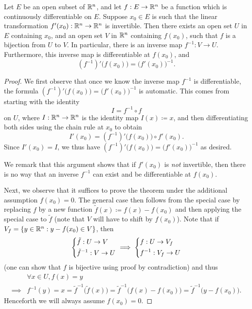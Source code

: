 \begin{thm}\label{ii:6.7.2}
  Let \(E\) be an open subset of \(\mathbb{R}^n\), and let \(f : E \to \mathbb{R}^n\) be a function which is continuously differentiable on \(E\).
  Suppose \(x_0 \in E\) is such that the linear transformation \(f'(x_0) : \mathbb{R}^n \to \mathbb{R}^n\) is invertible.
  Then there exists an open set \(U\) in \(E\) containing \(x_0\), and an open set \(V\) in \(\mathbb{R}^n\) containing \(f(x_0)\), such that \(f\) is a bijection from \(U\) to \(V\).
  In particular, there is an inverse map \(f^{-1} : V \to U\).
  Furthermore, this inverse map is differentiable at \(f(x_0)\), and
  \[
    (f^{-1})' \big(f(x_0)\big) = \big(f'(x_0)\big)^{-1}.
  \]
\end{thm}

\begin{proof}
  We first observe that once we know the inverse map \(f^{-1}\) is differentiable, the formula \((f^{-1})' \big(f(x_0)\big) = \big(f'(x_0)\big)^{-1}\) is automatic.
  This comes from starting with the identity
  \[
    I = f^{-1} \circ f
  \]
  on \(U\), where \(I : \mathbb{R}^n \to \mathbb{R}^n\) is the identity map \(I(x) \coloneqq x\), and then differentiating both sides using the chain rule at \(x_0\) to obtain
  \[
    I'(x_0) = (f^{-1})' \big(f(x_0)\big) \circ f'(x_0).
  \]
  Since \(I'(x_0) = I\), we thus have \((f^{-1})' \big(f(x_0)\big) = \big(f'(x_0)\big)^{-1}\) as desired.

  We remark that this argument shows that if \(f'(x_0)\) is \emph{not} invertible, then there is no way that an inverse \(f^{-1}\) can exist and be differentiable at \(f(x_0)\).

  Next, we observe that it suffices to prove the theorem under the additional assumption \(f(x_0) = 0\).
  The general case then follows from the special case by replacing \(f\) by a new function \(\tilde{f}(x) \coloneqq f(x) - f(x_0)\) and then applying the special case to \(\tilde{f}\)
  (note that \(V\) will have to shift by \(f(x_0)\)).
  Note that if \(V_f = \left\lbrace y \in \mathbb{R}^n : y - f(x_0) \in V\right\rbrace\), then
  \[
    \begin{dcases}
      \tilde{f} : U \to V \\
      \tilde{f}^{-1} : V \to U
    \end{dcases} \implies \begin{dcases}
      f : U \to V_f \\
      f^{-1} : V_f \to U
    \end{dcases}
  \]
  (one can show that \(f\) is bijective using proof by contradiction)
  and thus
  \begin{align*}
             & \forall x \in U, f(x) = y                                                                                                          \\
    \implies & f^{-1}(y) = x = \tilde{f}^{-1}\big(\tilde{f}(x)\big) = \tilde{f}^{-1}\big(f(x) - f(x_0)\big) = \tilde{f}^{-1}\big(y - f(x_0)\big).
  \end{align*}
  Henceforth we will always assume \(f(x_0) = 0\).


\end{proof}
